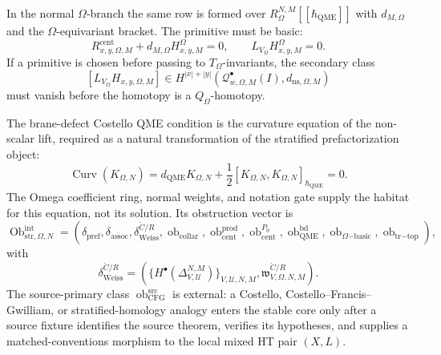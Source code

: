 \begin{enumerate}
  In the normal \(\Omega\)-branch the same row is formed over
  \(R_\Omega^{N,M}[[\hbar_{\mathrm{QME}}]]\) with \(d_{M,\Omega}\) and the
  \(\Omega\)-equivariant bracket.  The primitive must be basic:
  \[
    R^{\mathrm{cent}}_{x,y,\Omega,M}
      +d_{M,\Omega}H^\Omega_{x,y,M}=0,\qquad
    L_{V_\Omega}H^\Omega_{x,y,M}=0.
  \]
  If a primitive is chosen before passing to \(T_\Omega\)-invariants, the
  secondary class
  \[
    [L_{V_\Omega}H_{x,y,\Omega,M}]
      \in
    H^{|x|+|y|}
      (\mathcal Q^\bullet_{w,\Omega,M}(I),d_{\mathrm{ns},\Omega,M})
  \]
  must vanish before the homotopy is a \(Q_\Omega\)-homotopy.

  The brane-defect Costello QME condition is the curvature equation
  of the non-scalar lift, required as a natural transformation of the
  stratified prefactorization object:
  \[
    \operatorname{Curv}(K_{\Omega,N})
      =
      d_{\mathrm{QME}}K_{\Omega,N}
      +\frac12[K_{\Omega,N},K_{\Omega,N}]_{\hbar_{\mathrm{QME}}}=0.
  \]
  The Omega coefficient ring, normal weights, and notation gate supply
  the habitat for this equation, not its solution.  Its obstruction
  vector is
  \[
    \operatorname{Ob}^{\mathrm{int}}_{\mathrm{str},\Omega,N}
    =
    (\delta_{\mathrm{pref}},
     \delta_{\mathrm{assoc}},
     \delta_{\mathrm{Weiss}}^{\check C/R},
     \operatorname{ob}_{\mathrm{collar}},
     \operatorname{ob}^{\mathrm{prod}}_{\mathrm{cent}},
     \operatorname{ob}^{P_0}_{\mathrm{cent}},
     \operatorname{ob}^{\mathrm{bd}}_{\mathrm{QME}},
     \operatorname{ob}_{\Omega\mathrm{-basic}},
     \operatorname{ob}_{\mathrm{tr}\mathrm{-top}}),
  \]
  with
  \[
    \delta_{\mathrm{Weiss}}^{\check C/R}
    =
    \left(
      \{H^\bullet(\Delta^{N,M}_{V,\mathcal U})\}_{V,\mathcal U,N,M},
      \mathfrak w^{\check C/R}_{V,\Omega,N,M}
    \right).
  \]
  The source-primary class
  \(\operatorname{ob}^{\mathrm{src}}_{\mathrm{CFG}}\) is external: a
  Costello, Costello--Francis--Gwilliam, or stratified-homology analogy
  enters the stable core only after a source fixture identifies the
  source theorem, verifies its hypotheses, and supplies a
  matched-conventions morphism to the local mixed HT pair \((X,L)\).
\end{enumerate}
